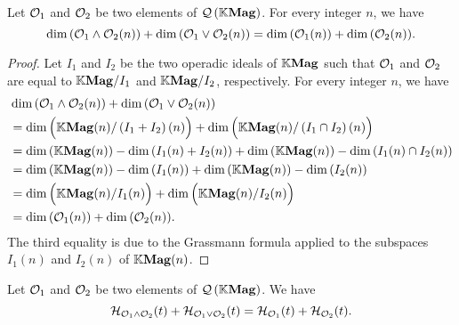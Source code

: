 \begin{Lemma} \label{lem:lattice_structure_and_coefficients_of_Hiblert_series}
  Let $\mathcal{O}_1$ and $\mathcal{O}_2$ be two elements of $\mathcal{Q}\left(\mathbb{K}\mathbf{Mag}\right)$. For every integer
  $n$, we have
  \begin{equation} \label{equ:lattice_structure_and_coefficients_of_the_Hiblert_series}
    \dim{\left(\mathcal{O}_1\wedge\mathcal{O}_2(n)\right)}+
    \dim{\left(\mathcal{O}_1\vee\mathcal{O}_2(n)\right)}=
    \dim{\left(\mathcal{O}_1(n)\right)}+\dim{\left(\mathcal{O}_2(n)\right)}.
  \end{equation}
\end{Lemma}

\begin{proof}
  Let $I_1$ and $I_2$ be the two operadic ideals of $\mathbb{K}\mathbf{Mag}$ such that
  $\mathcal{O}_1$ and $\mathcal{O}_2$ are equal to $\mathbb{K}\mathbf{Mag}/I_1$ and $\mathbb{K}\mathbf{Mag}/I_2$,
  respectively. For every integer $n$, we have
  \[\begin{split}
  &\dim{\left(\mathcal{O}_1\wedge\mathcal{O}_2(n)\right)}+
  \dim{\left(\mathcal{O}_1\vee\mathcal{O}_2(n)\right)}\\
  &=\dim{\Big(\mathbb{K}\mathbf{Mag}(n)/\left(I_1+I_2\right)(n)\Big)}+
  \dim{\Big(\mathbb{K}\mathbf{Mag}(n)/\left(I_1\cap I_2\right)(n)\Big)}\\
  &=\dim{\left(\mathbb{K}\mathbf{Mag}(n)\right)}-\dim{\left(I_1(n)+I_2(n)\right)}
  +\dim{\left(\mathbb{K}\mathbf{Mag}(n)\right)}-\dim{\left(I_1(n)\cap I_2(n)\right)}\\
  &=\dim{\left(\mathbb{K}\mathbf{Mag}(n)\right)}-\dim{\left(I_1(n)\right)}+
  \dim{\left(\mathbb{K}\mathbf{Mag}(n)\right)}-\dim{\left(I_2(n)\right)}\\
  &=\dim{\Big(\mathbb{K}\mathbf{Mag}(n)/I_1(n)\Big)}+\dim{\Big(\mathbb{K}\mathbf{Mag}(n)/I_2(n)\Big)}\\
  &=\dim{\left(\mathcal{O}_1(n)\right)}+\dim{\left(\mathcal{O}_2(n)\right)}.
  \end{split}\]
  The third equality is due to the Grassmann formula applied to the
  subspaces $I_1(n)$ and $I_2(n)$ of $\mathbb{K}\mathbf{Mag}(n)$.
\end{proof}

\begin{Theorem} \label{thm:Grassmann_formula_for__Hilbert_series_of_QMag}
  Let $\mathcal{O}_1$ and $\mathcal{O}_2$ be two elements of $\mathcal{Q}\left(\mathbb{K}\mathbf{Mag}\right)$. We have
  \begin{equation} \label{equ:lattice_structure_and_Hiblert_series}
    \mathcal{H}_{\mathcal{O}_1\wedge\mathcal{O}_2}(t)+\mathcal{H}_{\mathcal{O}_1\vee\mathcal{O}_2}(t)=\mathcal{H}_{\mathcal{O}_1}(t)+\mathcal{H}_{\mathcal{O}_2}(t).
    \end{equation}
  \end{Theorem}

